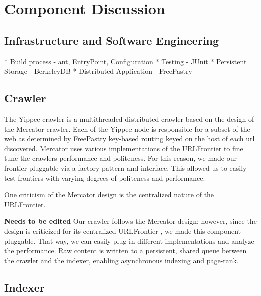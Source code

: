 \documentclass[11pt, letterpaper, oneside, twocolumn]{article}
\begin{document}
\section{Component Discussion}
\label{sec:component}



\subsection{Infrastructure and Software Engineering}

* Build process - ant, EntryPoint, Configuration
* Testing - JUnit
* Persistent Storage - BerkeleyDB
* Distributed Application - FreePastry 

\subsection{Crawler}

The Yippee crawler is a multithreaded distributed crawler based on the design of the Mercator crawler\cite{mercator}. 
Each of the Yippee node is responsible for a subset of the web as determined by FreePastry key-based routing keyed on the host of each url discovered.
Mercator uses various implementations of the URLFrontier to fine tune the crawlers performance and politeness.
For this reason, we made our frontier pluggable via a factory pattern and interface.
This allowed us to easily test frontiers with varying degrees of politeness and performance.

One criticism of the Mercator design\cite{ubi,para} is the centralized nature of the URLFrontier. 

\textbf{Needs to be edited}
Our crawler follows the Mercator design; however, since the design is
criticized for its centralized URLFrontier , we made this
component pluggable. That  way, we can easily plug in different implementations 
and analyze the  performance. Raw content  is  written to a persistent, shared queue  
between the crawler and  the indexer, enabling
asynchronous indexing and page-rank.

\subsection{Indexer}
\end{document}
